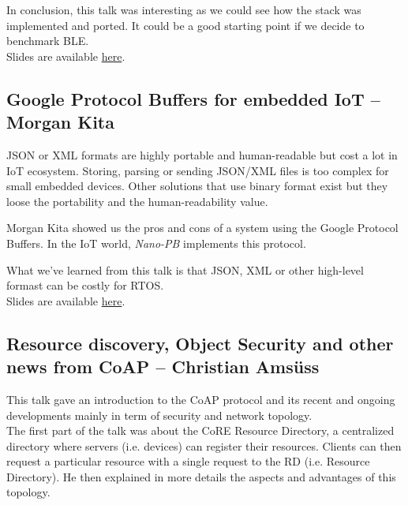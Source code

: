\documentclass[journal, a4paper]{../IEEEtran}
\begin{document}
In conclusion, this talk was interesting as we could see how the stack was implemented and ported.
It could be a good starting point if we decide to benchmark BLE. \\


Slides are available \href{http://summit.riot-os.org/2018/wp-content/uploads/sites/10/2018/09/1_1-Szymon-Janc-NimBLE.pdf}{here}.

\subsection{Google Protocol Buffers for embedded IoT -- Morgan Kita}

JSON or XML formats are highly portable and human-readable but cost a lot in IoT ecosystem. 
Storing, parsing or sending JSON/XML files is too complex for small embedded devices. 
Other solutions that use binary format exist but they loose the portability and the human-readability value.

Morgan Kita showed us the pros and cons of a system using the Google Protocol Buffers.
In the IoT world, \textit{Nano-PB} implements this protocol.

What we've learned from this talk is that JSON, XML or other high-level formast can be costly for RTOS. \\

Slides are available \href{http://summit.riot-os.org/2018/wp-content/uploads/sites/10/2018/09/1_2-Kita-Morgan-Protobuf.pdf}{here}.

\subsection{Resource discovery, Object Security and other news from CoAP -- Christian Amsüss}
This talk gave an introduction to the CoAP protocol and its recent and ongoing developments mainly in term of security and network topology.\\

The first part of the talk was about the CoRE Resource Directory, a centralized directory where servers (i.e. devices) can register their resources.
Clients can then request a particular resource with a single request to the RD (i.e. Resource Directory).
He then explained in more details the aspects and advantages of this topology.\\
\end{document}
